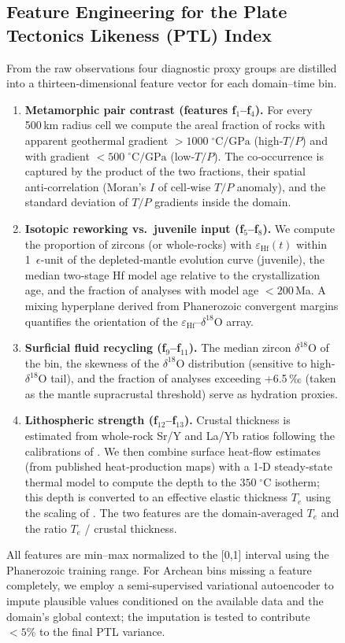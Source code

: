 \documentclass{article}
\begin{document}
\begin{figure}[t]
{\subsection{Feature Engineering for the Plate Tectonics Likeness (PTL) Index}
From the raw observations four diagnostic proxy groups are distilled into a thirteen‑dimensional feature vector for each domain–time bin.
\begin{enumerate}
    \item \textbf{Metamorphic pair contrast (features f$_1$–f$_4$).}  
    For every 500 km radius cell we compute the areal fraction of rocks with apparent geothermal gradient \(>1000\;^{\circ}\text{C/GPa}\) (high‑\(T/P\)) and with gradient \(<500\;^{\circ}\text{C/GPa}\) (low‑\(T/P\)).  
    The co‑occurrence is captured by the product of the two fractions, their spatial anti‑correlation (Moran’s \(I\) of cell‑wise \(T/P\) anomaly), and the standard deviation of \(T/P\) gradients inside the domain.
    \item \textbf{Isotopic reworking vs.\ juvenile input (f$_5$–f$_8$).}  
    We compute the proportion of zircons (or whole‑rocks) with \(\varepsilon_{\text{Hf}}(t)\) within 1 \(\epsilon\)‑unit of the depleted‑mantle evolution curve (juvenile), the median two‑stage Hf model age relative to the crystallization age, and the fraction of analyses with model age \(<200\) Ma.  
    A mixing hyperplane derived from Phanerozoic convergent margins quantifies the orientation of the \(\varepsilon_{\text{Hf}}\)–\(\delta^{18}\text{O}\) array.
    \item \textbf{Surficial fluid recycling (f$_9$–f$_{11}$).}  
    The median zircon \(\delta^{18}\text{O}\) of the bin, the skewness of the \(\delta^{18}\text{O}\) distribution (sensitive to high‑\(\delta^{18}\text{O}\) tail), and the fraction of analyses exceeding +6.5 ‰ (taken as the mantle supracrustal threshold) serve as hydration proxies.
    \item \textbf{Lithospheric strength (f$_{12}$–f$_{13}$).}  
    Crustal thickness is estimated from whole‑rock Sr/Y and La/Yb ratios following the calibrations of \cite{profound22}.  
    We then combine surface heat‑flow estimates (from published heat‑production maps) with a 1‑D steady‑state thermal model to compute the depth to the \(350\;^{\circ}\text{C}\) isotherm; this depth is converted to an effective elastic thickness \(T_e\) using the scaling of \cite{burov11}.  
    The two features are the domain‑averaged \(T_e\) and the ratio \(T_e\) / crustal thickness.
\end{enumerate}
All features are min–max normalized to the [0,1] interval using the Phanerozoic training range.  
For Archean bins missing a feature completely, we employ a semi‑supervised variational autoencoder to impute plausible values conditioned on the available data and the domain’s global context; the imputation is tested to contribute \(<5\%\) to the final PTL variance.

}
\end{figure}
\end{document}
